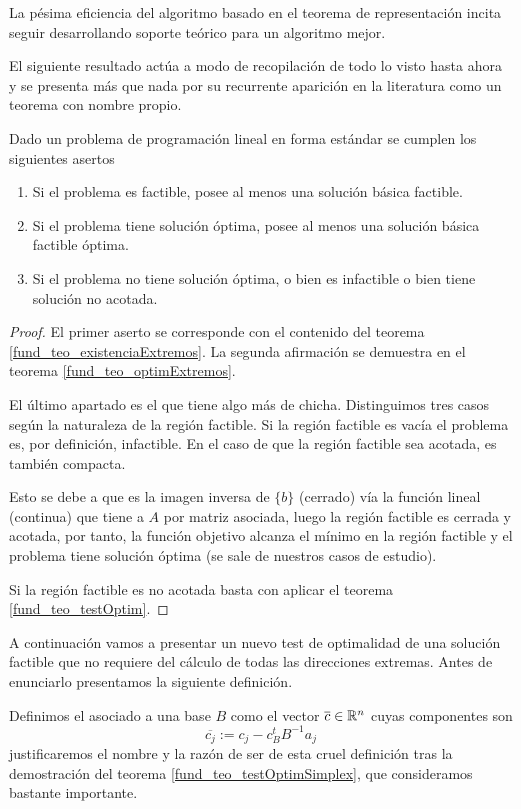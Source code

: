 La pésima eficiencia del algoritmo basado en el teorema de representación incita seguir desarrollando soporte teórico para un algoritmo mejor.

El siguiente resultado actúa a modo de recopilación de todo lo visto hasta ahora y se presenta más que nada por su recurrente aparición en la literatura como un teorema con nombre propio.
\begin{theo}
	Dado un problema de programación lineal en forma estándar se cumplen los siguientes asertos
	\begin{enumerate}
		\item Si el problema es factible, posee al menos una solución básica factible.
		\item Si el problema tiene solución óptima, posee al menos una solución básica factible óptima.
		\item Si el problema no tiene solución óptima, o bien es infactible o bien tiene solución no acotada.
	\end{enumerate}
\end{theo}
\begin{proof}
	El primer aserto se corresponde con el contenido del teorema \ref{fund_teo_existenciaExtremos}. La segunda afirmación se demuestra en el teorema \ref{fund_teo_optimExtremos}.
	
	El último apartado es el que tiene algo más de chicha. Distinguimos tres casos según la naturaleza de la región factible. Si la región factible es vacía el problema es, por definición, infactible. En el caso de que la región factible sea acotada, es también compacta. 
	
	Esto se debe a que es la imagen inversa de $\{b\}$ (cerrado) vía la función lineal (continua) que tiene a $A$ por matriz asociada, luego la región factible es cerrada y acotada, por tanto, la función objetivo alcanza el mínimo en la región factible y el problema tiene solución óptima (se sale de nuestros casos de estudio).
	
	Si la región factible es no acotada basta con aplicar el teorema \ref{fund_teo_testOptim}.
\end{proof}
A continuación vamos a presentar un nuevo test de optimalidad de una solución factible que no requiere del cálculo de todas las direcciones extremas. Antes de enunciarlo presentamos la siguiente definición.
\begin{defi}
	Definimos el  asociado a una base $B$ como el vector $\overline{c}\in\mathbb{R}^n$ cuyas componentes son
	\begin{equation*}
		\overline{c_j}:=c_j-c_B^tB^{-1}a_j
	\end{equation*}
	justificaremos el nombre y la razón de ser de esta cruel definición tras la demostración del teorema \ref{fund_teo_testOptimSimplex}, que consideramos bastante importante.
\end{defi}
